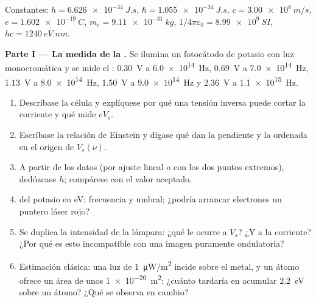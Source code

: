 \begin{problem}
\label{pb:b1:quantum-introduction:1}
Constantes: $h = \qty{6.626e-34}{J.s}$, $\hbar = \qty{1.055e-34}{J.s}$, $c =
\qty{3.00e8}{m/s}$, $e = \qty{1.602e-19}{C}$, $m_e = \qty{9.11e-31}{kg}$,
$1/4\pi\varepsilon_0 = \qty{8.99e9}{SI}$, $hc = \qty{1240}{eV.nm}$.

\medskip
\noindent\textbf{Parte I --- La medida de la .}
Se ilumina un fotocátodo de potasio con luz monocromática y se mide el
: \qty{0.30}{V} a \qty{6.0e14}{Hz}, \qty{0.69}{V} a
\qty{7.0e14}{Hz}, \qty{1.13}{V} a \qty{8.0e14}{Hz}, \qty{1.50}{V} a
\qty{9.0e14}{Hz} y \qty{2.36}{V} a \qty{1.1e15}{Hz}.
\begin{enumerate}
  \item Descríbase la célula y explíquese por qué una tensión inversa
        puede cortar la corriente y qué mide $eV_s$.
  \item Escríbase la relación de Einstein y dígase qué dan la pendiente y
        la ordenada en el origen de $V_s(\nu)$.
  \item A partir de los datos (por ajuste lineal o con los dos puntos
        extremos), dedúzcase $h$; compárese con el valor aceptado.
  \item {} del potasio en eV; frecuencia y  umbral; ¿podría arrancar electrones un puntero láser rojo?
  \item Se duplica la intensidad de la lámpara: ¿qué le ocurre a $V_s$? ¿Y
        a la corriente? ¿Por qué es esto incompatible con una imagen
        puramente ondulatoria?
  \item Estimación clásica: una luz de \qty{1}{\micro W/m^2} incide sobre el
        metal, y un átomo ofrece un área de unos \qty{1e-20}{m^2}: ¿cuánto
        tardaría en acumular \qty{2.2}{eV} sobre un átomo? ¿Qué se observa
        en cambio?
\end{enumerate}


\end{problem}

